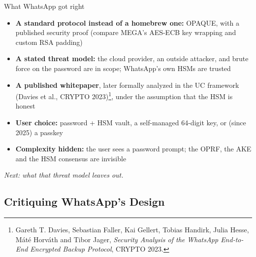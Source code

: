 \ifdefined\PRESENTATION\else\PassOptionsToClass{handout}{beamer}\fi\documentclass[aspectratio=169, lualatex]{beamer}
\begin{document}
\begin{frame}{What WhatsApp got right}
	\begin{itemize}
		\item \textbf{A standard protocol instead of a homebrew one:} OPAQUE, with a published security proof (compare MEGA's AES-ECB key wrapping and custom RSA padding)
		\item \textbf{A stated threat model:} the cloud provider, an outside attacker, and brute force on the password are in scope; WhatsApp's own HSMs are trusted
		\item \textbf{A published whitepaper}, later formally analyzed in the UC framework (Davies et al., CRYPTO 2023)\footnote{Gareth T. Davies, Sebastian Faller, Kai Gellert, Tobias Handirk, Julia Hesse, M\'at\'e Horv\'ath and Tibor Jager, \textit{Security Analysis of the WhatsApp End-to-End Encrypted Backup Protocol}, CRYPTO 2023.}, under the assumption that the HSM is honest
		\item \textbf{User choice:} password + HSM vault, a self-managed 64-digit key, or (since 2025) a passkey
		\item \textbf{Complexity hidden:} the user sees a password prompt; the OPRF, the AKE and the HSM consensus are invisible
	\end{itemize}
	\vspace{0.3cm}
	\begin{center}
		\textit{Next: what that threat model leaves out.}
	\end{center}
\end{frame}

\subsection{Critiquing WhatsApp's Design}
\end{document}
